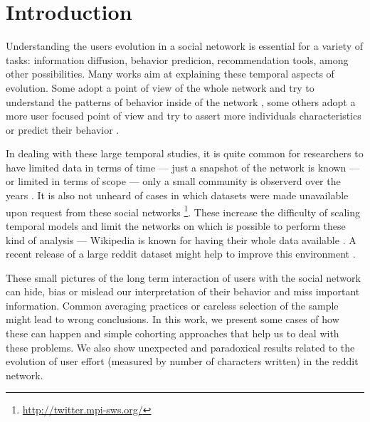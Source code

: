 \section{Introduction}


Understanding the users evolution in a social netowork is essential for a variety of tasks: information diffusion, behavior predicion, recommendation tools, among other possibilities. Many works aim at explaining these temporal aspects of evolution. Some adopt a point of view of the whole network and try to understand the patterns of behavior inside of the network \cite{Zhu2014, Kooti2010}, some others adopt a more user focused point of view and try to assert more individuals characteristics \cite{Correa2010, Priedhorsky2007, Panciera2009} or predict their behavior \cite{Danescu-niculescu-mizil2013}.

In dealing with these large temporal studies, it is quite common for researchers to have limited data in terms of time --- just a snapshot of the network is known \cite{} --- or limited in terms of scope --- only a small community is observerd over the years \cite{Lewis2008}. It is also not unheard of cases in which datasets were made unavailable upon request from these social networks \footnote{\url{http://twitter.mpi-sws.org/}}. These increase the difficulty of scaling temporal models and limit the networks on which is possible to perform these kind of analysis --- Wikipedia is known for having their whole data available \cite{Panciera2009, Priedhorsky2007}. A recent release of a large reddit dataset might help to improve this environment \cite{}.

These small pictures of the long term interaction of users with the social network can hide, bias or mislead our interpretation of their behavior and miss important information. Common averaging practices or careless selection of the sample might lead to wrong conclusions. In this work, we present some cases of how these can happen and simple cohorting approaches that help us to deal with these problems. We also show unexpected and paradoxical results related to the evolution of user effort (measured by number of characters written) in the reddit network.